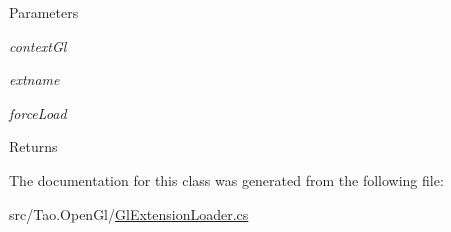 \begin{DoxyParams}{Parameters}
\item[{\em contextGl}]\item[{\em extname}]\item[{\em forceLoad}]\end{DoxyParams}
\begin{DoxyReturn}{Returns}

\end{DoxyReturn}


The documentation for this class was generated from the following file:\begin{DoxyCompactItemize}
\item 
src/Tao.OpenGl/\hyperlink{_gl_extension_loader_8cs}{GlExtensionLoader.cs}\end{DoxyCompactItemize}
